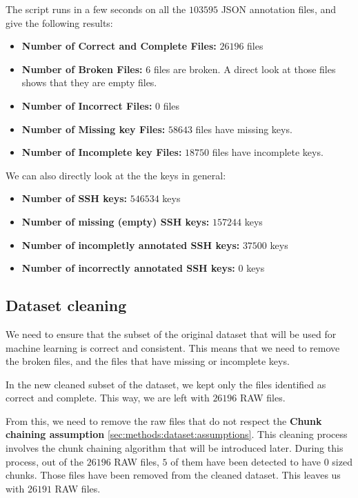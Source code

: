     The script runs in a few seconds on all the $103595$ JSON annotation files, and give the following results:

    \begin{itemize}
        \item \textbf{Number of Correct and Complete Files:} $ 26196 $ files 
        \item \textbf{Number of Broken Files:} $ 6 $ files are broken. A direct look at those files shows that they are empty files.
        \item \textbf{Number of Incorrect Files:} $ 0 $ files
        \item \textbf{Number of Missing key Files:} $ 58643 $ files have missing keys.
        \item \textbf{Number of Incomplete key Files:} $ 18750 $ files have incomplete keys.
    \end{itemize}

    We can also directly look at the the keys in general:

    \begin{itemize}
        \item \textbf{Number of SSH keys:} $546534$ keys
        \item \textbf{Number of missing (empty) SSH keys:} $157244$ keys
        \item \textbf{Number of incompletly annotated SSH keys:} $37500$ keys
        \item \textbf{Number of incorrectly annotated SSH keys:} $0$ keys
    \end{itemize}

    \subsection{Dataset cleaning}\label{sec:methods:dataset:cleaning}
    We need to ensure that the subset of the original dataset that will be used for machine learning is correct and consistent. This means that we need to remove the broken files, and the files that have missing or incomplete keys. 

    In the new cleaned subset of the dataset, we kept only the files identified as correct and complete. This way, we are left with $26196$ RAW files.

    From this, we need to remove the raw files that do not respect the \textbf{Chunk chaining assumption} \ref{sec:methods:dataset:assumptions}. This cleaning process involves the chunk chaining algorithm that will be introduced later. During this process, out of the $26196$ RAW files, $ 5 $ of them have been detected to have 0 sized chunks. Those files have been removed from the cleaned dataset. This leaves us with $26191$ RAW files.

